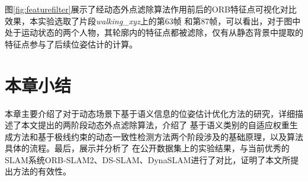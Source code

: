 图\ref{fig:featurefilter}展示了经动态外点滤除算法作用前后的ORB特征点可视化对比效果，本实验选取了片段\emph{walking\_xyz}上的第63帧
和第87帧，可以看出，对于图中处于运动状态的两个人物，其轮廓内的特征点都被滤除，仅有从静态背景中提取的特征点参与了后续位姿估计的计算。

\section{本章小结}
本章主要介绍了对于动态场景下基于语义信息的位姿估计优化方法的研究，详细描述了本文提出的两阶段动态外点滤除算法，介绍了
基于语义类别的自适应权重生成方法和基于极线约束的动态一致性检测方法两个阶段涉及的基础原理，以及算法具体的流程。最后，展示并分析了
在公开数据集上的实验结果，与当前优秀的SLAM系统ORB-SLAM2、DS-SLAM、DynaSLAM进行了对比，证明了本文所提出方法的有效性。
